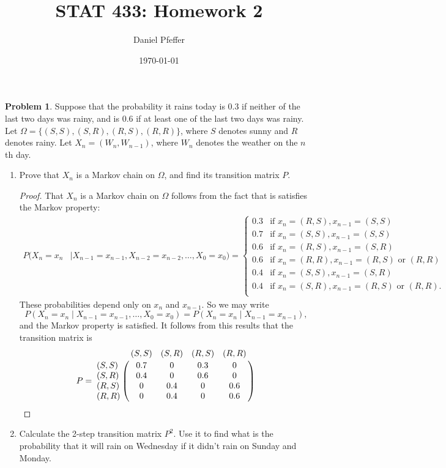\documentclass[oneside,reqno]{amsart}
\title{STAT 433: Homework 2}
\author{Daniel Pfeffer}
\date{\today}
\theoremstyle{definition}
\newtheorem{prob}{Problem}
\begin{document}
\maketitle


\begin{prob}
Suppose that the probability it rains today is 0.3 if neither of the last two days was rainy, and is 0.6 if at least one of the last two days was rainy. Let $\Omega = \{(S,S), (S,R), (R,S), (R,R)\}$, where $S$ denotes sunny and $R$ denotes rainy. Let $X_n = (W_n, W_{n-1})$, where $W_n$ denotes the weather on the $n$th day.
\end{prob}


\begin{enumerate}
\item
Prove that $X_n$ is a Markov chain on $\Omega$, and find its transition matrix $P$.
\begin{proof}
That $X_n$ is a Markov chain on $\Omega$ follows from the fact that is satisfies the Markov property:
\begin{align*}
	P(X_n = x_n & \mid X_{n-1} = x_{n-1}, X_{n-2} = x_{n-2}, \dotsc, X_0 = x_0) 
	= \begin{cases}
		0.3 & \text{if } x_n = (R,S), x_{n-1}= (S,S) \\
		0.7 & \text{if } x_n = (S,S), x_{n-1}= (S,S) \\
		0.6 & \text{if } x_n = (R,S), x_{n-1}= (S,R) \\
		0.6 & \text{if } x_n = (R,R), x_{n-1}= (R,S) \text{ or } (R,R) \\
		0.4 & \text{if } x_n = (S,S), x_{n-1}= (S,R) \\
		0.4 & \text{if } x_n = (S,R), x_{n-1}= (R,S) \text{ or } (R,R). \\
	\end{cases}
\end{align*}
These probabilities depend only on $x_n$ and $x_{n-1}$. So we may write 
\[
	 P(X_n = x_n  \mid X_{n-1} = x_{n-1}, \dotsc, X_0 = x_0) = P(X_n = x_n \mid X_{n-1} = x_{n-1}),
\]
and the Markov property is satisfied. It follows from this results that the transition matrix is 
\[
	P = \bordermatrix{~ & (S,S) & (S,R) & (R,S) &(R,R) \cr 
		(S,S) & 0.7 & 0 & 0.3 & 0 \cr
		(S,R) & 0.4 & 0 & 0.6 & 0 \cr
		(R,S) & 0 & 0.4 & 0 & 0.6 \cr
		(R,R) & 0 & 0.4 & 0 & 0.6 \cr}
\]
\end{proof}
\item
Calculate the 2-step transition matrix $P^2$. Use it to find what is the probability that it will rain on Wednesday if it didn't rain on Sunday and Monday.

\end{enumerate}
\end{document}
